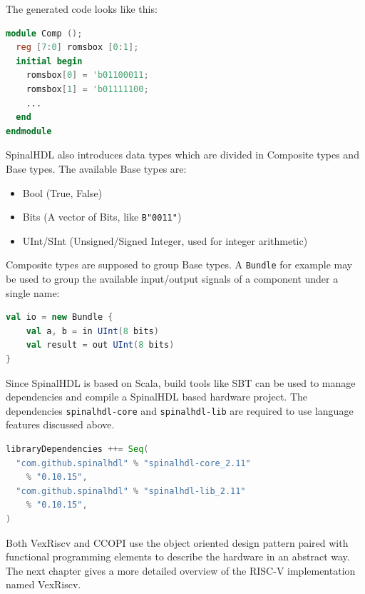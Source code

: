 \documentclass[twoside,twocolumn]{article}
\newcommand{\code}[1]{\texttt{#1}}
\begin{document}
\noindent The generated code looks like this:
\begin{lstlisting}[language=verilog]
module Comp ();
  reg [7:0] romsbox [0:1];
  initial begin
    romsbox[0] = 'b01100011;
    romsbox[1] = 'b01111100;
    ...
  end
endmodule
\end{lstlisting}
SpinalHDL also introduces data types which are divided in Composite
types and Base types. The available Base types are:
\begin{itemize}
    \item Bool (True, False)
    \item Bits (A vector of Bits, like \code{B"0011"})
    \item UInt/SInt (Unsigned/Signed Integer, used for integer
        arithmetic)
\end{itemize}
Composite types are supposed to group Base types. A \code{Bundle} for
example may be used to group the available input/output signals of a
component under a single name:
\begin{lstlisting}[language=scala]
val io = new Bundle {
    val a, b = in UInt(8 bits)
    val result = out UInt(8 bits)
}
\end{lstlisting}
Since SpinalHDL is based on Scala, build tools like SBT can be used to
manage dependencies and compile a SpinalHDL based hardware project. The
dependencies \code{spinalhdl-core} and \code{spinalhdl-lib} are required
to use language features discussed above.
\begin{lstlisting}[language=scala]
libraryDependencies ++= Seq(
  "com.github.spinalhdl" % "spinalhdl-core_2.11" 
    % "0.10.15",
  "com.github.spinalhdl" % "spinalhdl-lib_2.11" 
    % "0.10.15",
)
\end{lstlisting}

Both VexRiscv and CCOPI use the object oriented design pattern paired
with functional programming elements to describe the hardware in an
abstract way. The next chapter gives a more detailed overview of the
RISC-V implementation named VexRiscv.
\end{document}
